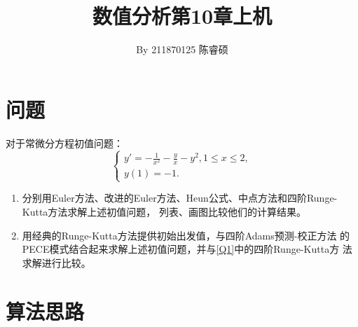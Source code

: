 \documentclass[a4paper,11pt,notitlepage]{article}
\title{\vspace{-1.5cm} \textbf{\huge{数值分析第10章上机}}\vspace{-1em}}
\author{By 211870125 陈睿硕}
\date{}
\begin{document}
\maketitle
\vspace{-1cm}
\thispagestyle{fancy}

\section{问题}
\begin{adjustwidth}{1em}{0pt}
    对于常微分方程初值问题：
    \[    
    \begin{cases}
            y'=-\frac{1}{x^2}-\frac{y}{x}-y^2,1\leqslant x\leqslant 2,\\
            y(1)=-1.
    \end{cases}
    \]
\begin{enumerate}[label=\textbf{Q\arabic*}]
    \item 分别用Euler方法、改进的Euler方法、Heun公式、中点方法和四阶Runge-Kutta方法求解上述初值问题，
    列表、画图比较他们的计算结果。\label{Q1}\notag
    \item 用经典的Runge-Kutta方法提供初始出发值，与四阶Adams预测-校正方法
    的PECE模式结合起来求解上述初值问题，并与\ref{Q1}中的四阶Runge-Kutta方
    法求解进行比较。\label{Q2}\notag
\end{enumerate}
\end{adjustwidth}

\section{算法思路}
\end{document}
